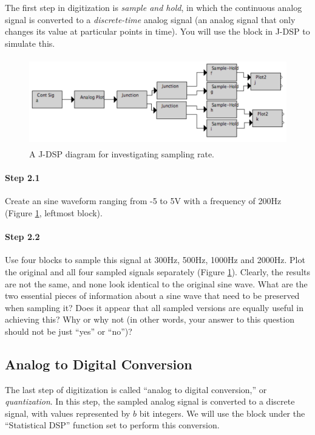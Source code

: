 The first step in digitization is \emph{sample and hold}, in which the
continuous analog signal is converted to a \textit{discrete-time}
analog signal (an analog signal that only changes its value at
particular points in time). You will use the  block
in J-DSP to simulate this.

\begin{figure}[h]
  \begin{center}
    \includegraphics[height=1.5in]{lab3/block_diagram_step2}
  \end{center}
  \caption{ A J-DSP diagram for investigating sampling rate. \label{fg:step2}}
\end{figure}

\paragraph{Step 2.1} Create an  sine waveform ranging
from -5 to 5V with a frequency of 200Hz (Figure \ref{fg:step2},
leftmost block).

\paragraph{Step 2.2} Use four  blocks to sample
this signal at 300Hz, 500Hz, 1000Hz and 2000Hz. Plot the original and
all four sampled signals separately (Figure \ref{fg:step2}). Clearly,
the results are not the same, and none look identical to the original
sine wave. What are the two essential pieces of information about a
sine wave that need to be preserved when sampling it?  Does it appear
that all sampled versions are equally useful in achieving this? Why or
why not (in other words, your answer to this question should not be
just ``yes'' or ``no'')?


\subsection{Analog to Digital Conversion}

	The last step of digitization is called ``analog to digital conversion,'' or \emph{quantization}. In 
	this step, the sampled analog signal is converted to a discrete signal, with values represented 
	by $b$ bit integers. We will use the  block under the ``Statistical DSP'' function 
	set to perform this conversion.
	
